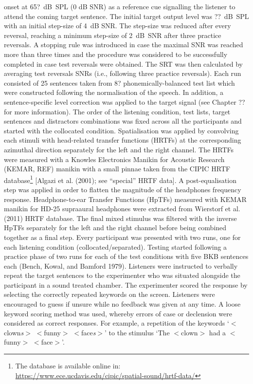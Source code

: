 \documentclass[a4paper,nobind]{templates/ociamthesis}
\begin{document}
onset at 65?~dB~SPL (0 dB SNR) as a reference cue signalling the
listener to attend the coming target sentence. The initial target output
level was ??~dB~SPL with an initial step-size of 4~dB SNR. The step-size
was reduced after every reversal, reaching a minimum step-size of
2~dB~SNR after three practice reversals. A stopping rule was introduced
in case the maximal SNR was reached more than three times and the
procedure was considered to be successfully completed in case test
reversals were obtained. The SRT was then calculated by averaging test
reversals SNRs (i.e., following three practice reversals). Each run
consisted of 25 sentences taken from 8? phonemically-balanced test list
which were constructed following the normalisation of the speech. In
addition, a sentence-specific level correction was applied to the target
signal (see Chapter ?? for more information). The order of the listening
condition, test lists, target sentences and distractors combinations was
fixed across all the participants and started with the collocated
condition. Spatialisation was applied by convolving each stimuli with
head-related transfer functions (HRTFs) at the corresponding azimuthal
direction separately for the left and the right channel. The HRTFs were
measured with a Knowles Electronics Manikin for Acoustic Research
(KEMAR, REF) manikin with a small pinnae taken from the CIPIC HRTF
database\footnote{The database is available online in:
  \url{https://www.ece.ucdavis.edu/cipic/spatial-sound/hrtf-data/}}
{[}Algazi et al. (2001); see ``special'' HRTF data{]}. A
post-equalisation step was applied in order to flatten the magnitude of
the headphones frequency response. Headphone-to-ear Transfer Functions
(HpTFs) measured with KEMAR manikin for HD-25 supraaural headphones were
extracted from Wierstorf et al. (2011) HRTF database. The final mixed
stimulus was filtered with the inverse HpTFs separately for the left and
the right channel before being combined together as a final step. Every
participant was presented with two runs, one for each listening
condition (collocated/separated). Testing started following a practice
phase of two runs for each of the test conditions with five BKB
sentences each (Bench, Kowal, and Bamford 1979). Listeners were
instructed to verbally repeat the target sentences to the experimenter
who was situated alongside the participant in a sound treated chamber.
The experimenter scored the response by selecting the correctly repeated
keywords on the screen. Listeners were encouraged to guess if unsure
while no feedback was given at any time. A loose keyword scoring method
was used, whereby errors of case or declension were considered as
correct responses. For example, a repetition of the keywords
`\(<\)clown\emph{s}\(>\) \(<\)funny\(>\) \(<\)face\emph{s}\(>\)' to the
stimulus `The \(<\)clown\(>\) had a \(<\)funny\(>\) \(<\)face\(>\)'.
\end{document}
